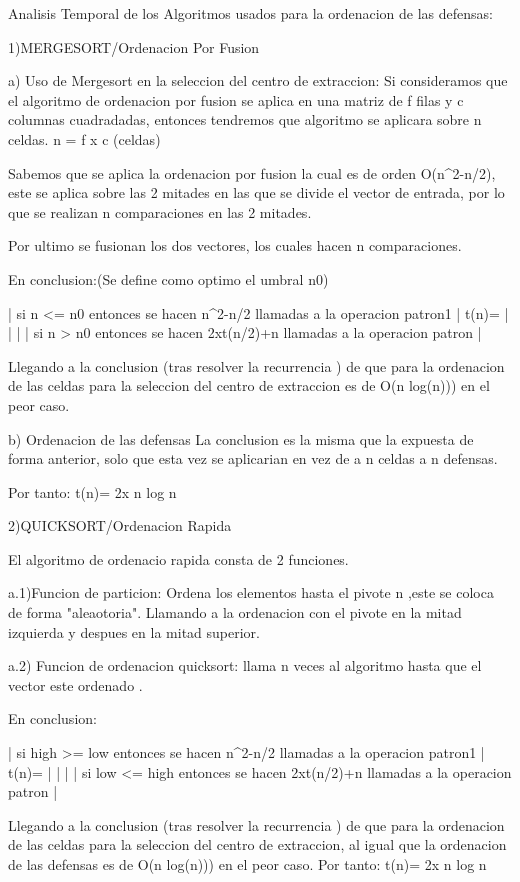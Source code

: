Analisis Temporal de los Algoritmos usados para la ordenacion de las defensas:

1)MERGESORT/Ordenacion Por Fusion

    a) Uso de Mergesort en la seleccion del centro de extraccion:
        Si consideramos que el algoritmo de ordenacion por fusion se aplica en una matriz de f filas y 
        c columnas cuadradadas, entonces tendremos que algoritmo se aplicara sobre n celdas.
        n = f x c (celdas)

        Sabemos que se aplica la ordenacion por fusion la cual es de orden O(n^2-n/2),
        este se aplica sobre las 2 mitades en las que se divide el vector de entrada, 
        por lo que se realizan n comparaciones en las 2 mitades.

        Por ultimo se fusionan los dos vectores, los cuales hacen n comparaciones.

        En conclusion:(Se define como optimo el umbral n0)

            |  si n <= n0  entonces se hacen n^2-n/2 llamadas a la operacion patron1 
            |
    t(n)=  |
           |
           |
            | si n > n0 entonces se hacen 2xt(n/2)+n llamadas a la operacion patron
            | 

        Llegando a la conclusion (tras resolver la recurrencia ) de que para la 
        ordenacion de las celdas para la seleccion del centro de extraccion es de
        O(n log(n))) en el peor caso.

    b) Ordenacion de las defensas
        La conclusion es la misma que la expuesta de forma anterior, solo que esta vez
        se aplicarian en vez de a n celdas a n defensas.

    Por tanto: t(n)= 2x n log n

2)QUICKSORT/Ordenacion Rapida

    El algoritmo de ordenacio rapida consta de 2 funciones.
    
    a.1)Funcion de particion: Ordena los elementos hasta el pivote n ,este se coloca 
    de forma "aleaotoria".
    Llamando a la ordenacion con el pivote en la mitad izquierda y despues en la mitad
    superior.

    a.2) Funcion de ordenacion quicksort: llama n veces al algoritmo hasta que el vector 
    este ordenado .

    En conclusion:

    
            |  si high >= low  entonces se hacen n^2-n/2 llamadas a la operacion patron1 
            |
    t(n)=  |
           |
           |
            | si low <= high entonces se hacen 2xt(n/2)+n llamadas a la operacion patron
            | 
    
    
        Llegando a la conclusion (tras resolver la recurrencia ) de que para la 
        ordenacion de las celdas para la seleccion del centro de extraccion, al igual
        que la ordenacion de las defensas es de O(n log(n))) en el peor caso.
        Por tanto: t(n)= 2x n log n